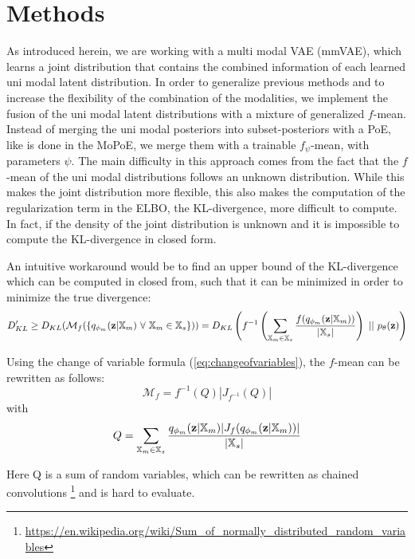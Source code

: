 \section{Methods}
\label{sec:methods}
As introduced herein, we are working with a multi modal VAE (mmVAE), which learns a joint distribution that contains the combined information of each learned uni modal latent distribution.
In order to generalize previous methods and to increase the flexibility of the combination of the modalities, we implement the fusion of the uni modal latent distributions with a mixture of generalized $f$-mean.
Instead of merging the uni modal posteriors into subset-posteriors with a PoE, like is done in the MoPoE, we merge them with a trainable $f_{\psi}$-mean, with parameters $\psi$.
The main difficulty in this approach comes from the fact that the $f$-mean of the uni modal distributions follows an unknown distribution.
While this makes the joint distribution more flexible, this also makes the computation of the regularization term in the ELBO, the KL-divergence, more difficult to compute.
In fact, if the density of the joint distribution is unknown and it is impossible to compute the KL-divergence in closed form.

An intuitive workaround would be to find an upper bound of the KL-divergence which can be computed in closed from, such that it can be minimized in order to minimize the true divergence:
\begin{equation}
    \label{eq:kldivbound}
    D_{KL}^{\prime} \geq D_{KL}(\mathcal{M}_f(\{\unimodalpost\ \forall\ \xsetm \in \xsubset\})) =  D_{KL}\left(f^{-1}\left(\sum _{\xsetm \in \xsubset} \frac{f(\unimodalpost)}{|\xsubset|}\right)\ ||\ \prior\right)
\end{equation}

Using the change of variable formula (\cref{eq:changeofvariables}), the $f$-mean can be rewritten as follows:
\begin{equation}
    \mathcal{M}_f = f^{-1}(Q)|J_{f^{-1}}(Q)|
\end{equation}
with
\begin{equation}
    Q= \sum _{\mathbb{X}_m \in \mathbb{X}_s} \frac{q_{\phi_m}(\textbf{z}|\mathbb{X}_m)|J_f(q_{\phi_m}(\textbf{z}|\mathbb{X}_m))|}{|\mathbb{X}_s|}
\end{equation}

Here Q is a sum of random variables, which can be rewritten as chained convolutions \footnote{\url{https://en.wikipedia.org/wiki/Sum_of_normally_distributed_random_variables}} and is hard to evaluate.

